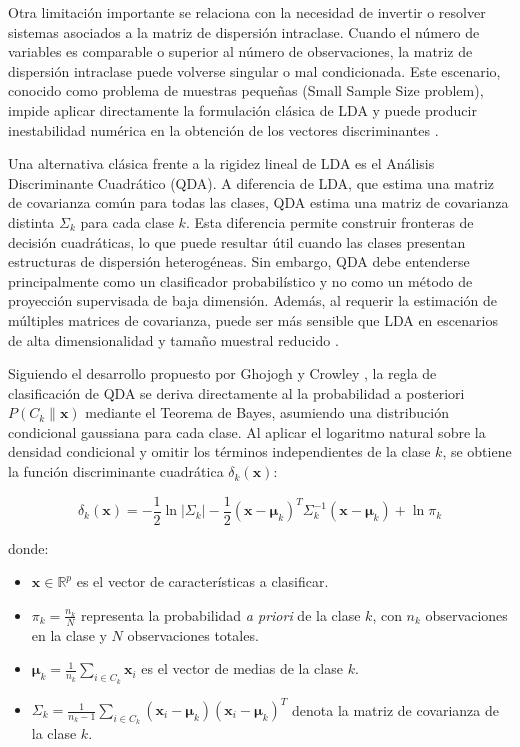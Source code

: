 Otra limitación importante se relaciona con la necesidad de invertir o resolver sistemas asociados a la matriz de dispersión intraclase. Cuando el número de variables es comparable o superior al número de observaciones, la matriz de dispersión intraclase puede volverse singular o mal condicionada. Este escenario, conocido como problema de muestras pequeñas (Small Sample Size problem), impide aplicar directamente la formulación clásica de LDA y puede producir inestabilidad numérica en la obtención de los vectores discriminantes \cite{gao2006direct}.

Una alternativa clásica frente a la rigidez lineal de LDA es el Análisis Discriminante Cuadrático (QDA). A diferencia de LDA, que estima una matriz de covarianza común para todas las clases, QDA estima una matriz de covarianza distinta $\Sigma_k$ para cada clase $k$. Esta diferencia permite construir fronteras de decisión cuadráticas, lo que puede resultar útil cuando las clases presentan estructuras de dispersión heterogéneas. Sin embargo, QDA debe entenderse principalmente como un clasificador probabilístico y no como un método de proyección supervisada de baja dimensión. Además, al requerir la estimación de múltiples matrices de covarianza, puede ser más sensible que LDA en escenarios de alta dimensionalidad y tamaño muestral reducido \cite{duda2000pattern,ghojogh2019linear}.

Siguiendo el desarrollo propuesto por Ghojogh y Crowley \cite{ghojogh2019linear}, la regla de clasificación de QDA se deriva directamente al la probabilidad a posteriori $P(C_k\|\mathbf{x})$ mediante el Teorema de Bayes, asumiendo una distribución condicional gaussiana para cada clase. Al aplicar el logaritmo natural sobre la densidad condicional y omitir los términos independientes de la clase $k$, se obtiene la función discriminante cuadrática $\delta_k(\mathbf{x})$: 

\begin{equation}
	\delta_k(\mathbf{x}) = -\frac{1}{2} \ln |\Sigma_k| - \frac{1}{2} (\mathbf{x} - \boldsymbol{\mu}_k)^T \Sigma_k^{-1} (\mathbf{x} - \boldsymbol{\mu}_k) + \ln \pi_k
	\label{eq:EMT8}
\end{equation}

donde:
\begin{itemize}
	\item $\mathbf{x} \in \mathbb{R}^p$ es el vector de características a clasificar.
	\item $\pi_k = \frac{n_k}{N}$ representa la probabilidad \textit{a priori} de la clase $k$, con $n_k$ observaciones en la clase y $N$ observaciones totales.
	\item $\boldsymbol{\mu}_k = \frac{1}{n_k} \sum_{i \in C_k}{\mathbf{x}_i}$ es el vector de medias de la clase $k$.
	\item $\Sigma_k = \frac{1}{n_k - 1} \sum_{i \in C_k} (\mathbf{x}_i - \boldsymbol{\mu}_k)(\mathbf{x}_i - \boldsymbol{\mu}_k)^T$ denota la matriz de covarianza de la clase $k$.
\end{itemize}






